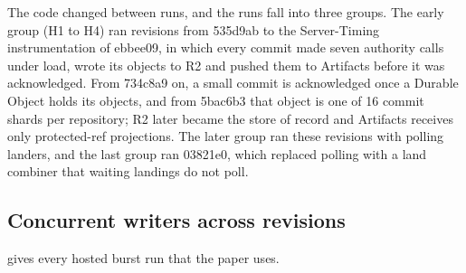 \documentclass[11pt,letterpaper]{article}
\theoremstyle{definition}
\theoremstyle{remark}
\begin{document}
The code changed between runs, and the runs fall into three groups. The early group (H1 to H4) ran revisions from 535d9ab to the Server-Timing instrumentation of ebbee09, in which every commit made seven authority calls under load, wrote its objects to R2 and pushed them to Artifacts before it was acknowledged. From 734c8a9 on, a small commit is acknowledged once a Durable Object holds its objects, and from 5bac6b3 that object is one of 16 commit shards per repository; R2 later became the store of record and Artifacts receives only protected-ref projections. The later group ran these revisions with polling landers, and the last group ran 03821e0, which replaced polling with a land combiner that waiting landings do not poll.

\subsection{Concurrent writers across revisions}

 gives every hosted burst run that the paper uses.
\end{document}
